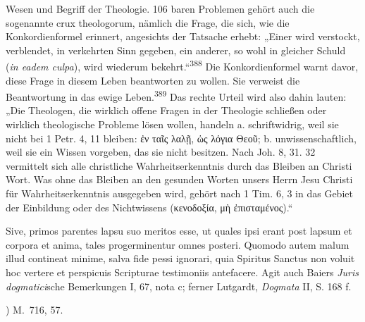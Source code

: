 \noindent Wesen und Begriff der Theologie. \hfill 106
baren Problemen gehört auch die sogenannte crux theologorum, nämlich die Frage, die sich, wie die Konkordienformel erinnert, angesichts der Tatsache erhebt: „Einer wird verstockt, verblendet, in verkehrten Sinn gegeben, ein anderer, so wohl in gleicher Schuld (\textit{in eadem culpa}), wird wiederum bekehrt.“\textsuperscript{388} Die Konkordienformel warnt davor, diese Frage in diesem Leben beantworten zu wollen. Sie verweist die Beantwortung in das ewige Leben.\textsuperscript{389} Das rechte Urteil wird also dahin lauten: „Die Theologen, die wirklich offene Fragen in der Theologie schließen oder wirklich theologische Probleme lösen wollen, handeln a. schriftwidrig, weil sie nicht bei 1 Petr. 4, 11 bleiben: \foreignlanguage{greek}{ἐν ταῖς λαλῇ, ὡς λόγια Θεοῦ}; b. unwissenschaftlich, weil sie ein Wissen vorgeben, das sie nicht besitzen. Nach Joh. 8, 31. 32 vermittelt sich alle christliche Wahrheitserkenntnis durch das Bleiben an Christi Wort. Was ohne das Bleiben an den gesunden Worten unsers Herrn Jesu Christi für Wahrheitserkenntnis ausgegeben wird, gehört nach 1 Tim. 6, 3 in das Gebiet der Einbildung oder des Nichtwissens (\foreignlanguage{greek}{κενοδοξία, μὴ ἐπισταμένος}).“

Sive, primos parentes lapsu suo meritos esse, ut quales ipsi erant post lapsum et corpora et anima, tales progerminentur omnes posteri. Quomodo autem malum illud contineat minime, salva fide pessi ignorari, quia Spiritus Sanctus non voluit hoc vertere et perspicuis Scripturae testimoniis antefacere. Agit auch Baiers \textit{Juris dogmatici}sche Bemerkungen I, 67, nota c; ferner Lutgardt, \textit{Dogmata} II, S. 168 f.

\vspace{1em}

) M.~716, 57.

